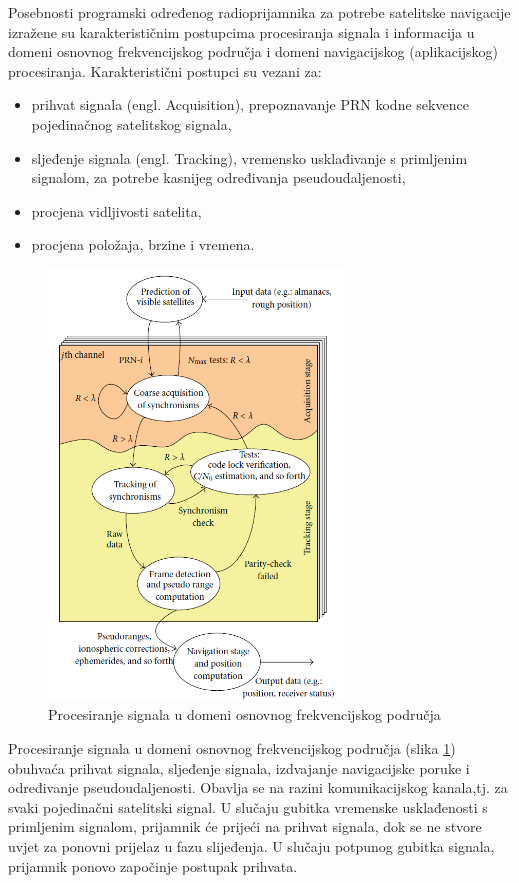 \documentclass[a4paper,twoside,12pt]{memoir} %
\begin{document}
Posebnosti programski određenog radioprijamnika za potrebe
satelitske navigacije izražene su karakterističnim postupcima procesiranja signala i informacija u
domeni osnovnog frekvencijskog područja i domeni navigacijskog (aplikacijskog) procesiranja.
Karakteristični postupci su vezani za:
\begin{itemize}
	\item prihvat signala (engl. Acquisition), prepoznavanje PRN kodne sekvence pojedinačnog
	satelitskog signala,
	\item sljeđenje signala (engl. Tracking), vremensko usklađivanje s primljenim signalom, za
	potrebe kasnijeg određivanja pseudoudaljenosti,
	\item procjena vidljivosti satelita,
	\item procjena položaja, brzine i vremena.
\end{itemize}

\begin{figure}[H]
	\centering
	\includegraphics[width=0.7\textwidth]{prihvatSignala}
	\caption{Procesiranje signala u domeni osnovnog frekvencijskog područja}
	\label{Fig:prihvat}	
\end{figure}

Procesiranje signala u domeni osnovnog frekvencijskog područja (slika \ref{Fig:prihvat}) obuhvaća prihvat
signala, sljeđenje signala, izdvajanje navigacijske poruke i određivanje pseudoudaljenosti. Obavlja se
na razini komunikacijskog kanala,tj. za svaki pojedinačni satelitski signal. U slučaju gubitka
vremenske usklađenosti s primljenim signalom, prijamnik će prijeći na prihvat signala, dok se ne
stvore uvjet za ponovni prijelaz u fazu slijeđenja. U slučaju potpunog gubitka signala, prijamnik ponovo započinje postupak prihvata.
\end{document}
